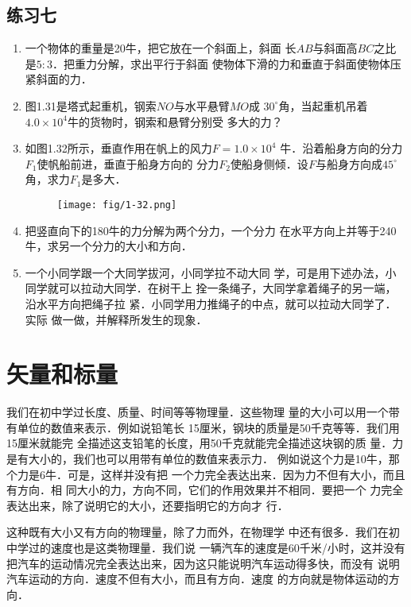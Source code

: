 \subsection*{练习七}
\begin{enumerate}

\item 一个物体的重量是20牛，把它放在一个斜面上，斜面
长$AB$与斜面高$BC$之比是$5:3$．把重力分解，求出平行于斜面
使物体下滑的力和垂直于斜面使物体压紧斜面的力．
 


\item 图1.31是塔式起重机，钢索$NO$与水平悬臂$MO$成
$30^\circ$角，当起重机吊着$4.0\times 10^4$牛的货物时，钢索和悬臂分别受
多大的力？
\item 如图1.32所示，垂直作用在帆上的风力$F=1.0\times 10^4$
牛．沿着船身方向的分力$F_1$使帆船前进，垂直于船身方向的
分力$F_2$使船身侧倾．设$F$与船身方向成$45^\circ$角，求力$F_1$是多大．
\begin{figure}[htp]
\centering\texttt{[image: fig/1-32.png]}
\caption{}
\end{figure}

\item 把竖直向下的180牛的力分解为两个分力，一个分力
在水平方向上并等于240牛，求另一个分力的大小和方向．

\item 一个小同学跟一个大同学拔河，小同学拉不动大同
学，可是用下述办法，小同学就可以拉动大同学．在树干上
拴一条绳子，大同学拿着绳子的另一端，沿水平方向把绳子拉
紧．小同学用力推绳子的中点，就可以拉动大同学了．实际
做一做，并解释所发生的现象．

\end{enumerate}

\section{矢量和标量}
    我们在初中学过长度、质量、时间等等物理量．这些物理
量的大小可以用一个带有单位的数值来表示．例如说铅笔长
15厘米，钢块的质量是50千克等等．我们用15厘米就能完
全描述这支铅笔的长度，用50千克就能完全描述这块钢的质
量．力是有大小的，我们也可以用带有单位的数值来表示力．
例如说这个力是10牛，那个力是6牛．可是，这样并没有把
一个力完全表达出来．因为力不但有大小，而且有方向．相
同大小的力，方向不同，它们的作用效果并不相同．要把一个
力完全表达出来，除了说明它的大小，还要指明它的方向才
行．

    这种既有大小又有方向的物理量，除了力而外，在物理学
中还有很多．我们在初中学过的速度也是这类物理量．我们说
一辆汽车的速度是60千米/小时，这并没有把汽车的运动情况完全表达出来，因为这只能说明汽车运动得多快，而没有
说明汽车运动的方向．速度不但有大小，而且有方向．速度
的方向就是物体运动的方向．

